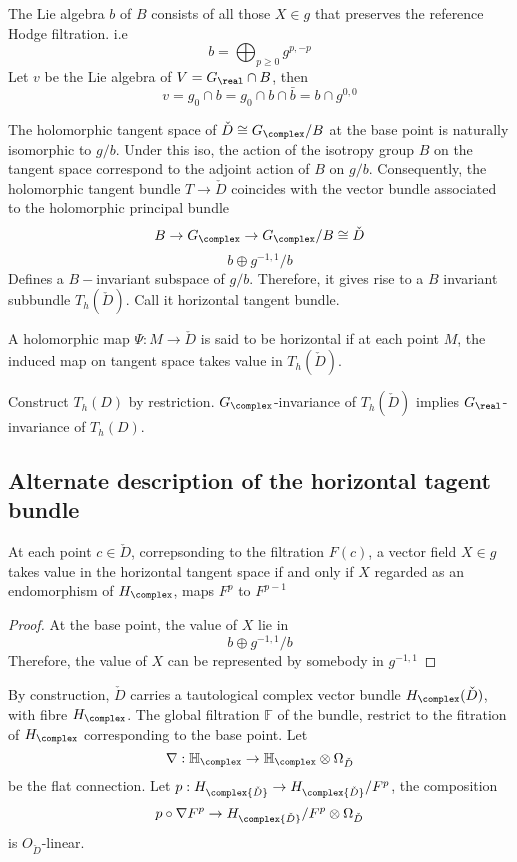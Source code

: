 \documentclass{article}
\begin{document}
The Lie algebra $b$ of $B$ consists of all those $X \in g$ that preserves the reference Hodge
filtration. i.e
\[
    b = \bigoplus_{p\ge 0} g^{p,-p}
\]
Let $v$ be the Lie algebra of $V = G_{\real}\cap B$, then
\[
    v = g_0 \cap b = g_0\cap b \cap \bar{b} = b\cap g^{0,0}
\]

The holomorphic tangent space of $\check{D} \cong G_{\complex}/B$ at 
the base point is naturally isomorphic to $g/b$. Under this iso, the
action of the isotropy group $B$ on the tangent space correspond to
the adjoint action of $B$ on $g/b$. Consequently, the holomorphic tangent
bundle $T \rightarrow \check{D}$ coincides with the vector bundle associated
to the holomorphic principal bundle
\[
    B \rightarrow G_{\complex} \rightarrow G_{\complex}/B \cong \check{D}
\]
\[
    b \oplus g^{-1,1}/b 
\]
Defines a $B-$invariant subspace of $g/b$. Therefore, it gives rise to a $B$
invariant subbundle $T_h(\check{D})$. Call it horizontal tangent bundle.

A holomorphic map $\Psi: M \rightarrow \check{D}$ is said to be horizontal if 
at each point $M$, the induced map on tangent space takes value in $T_h(\check{D})$.

Construct $T_h(D)$ by restriction. $G_{\complex}$-invariance of $T_h(\check{D})$ 
implies $G_{\real}$-invariance of $T_h(D)$. 

\subsection{Alternate description of the horizontal tagent bundle}
\begin{lemma}
At each point $c \in \check{D}$, correpsonding to the filtration $F(c)$, a vector
field $X \in g$ takes value in the horizontal tangent space if and only if
$X$ regarded as an endomorphism of $H_{\complex}$, maps $F^p$ to $F^{p-1}$
\end{lemma}
\begin{proof}
At the base point, the value of $X$ lie in
\[
    b\oplus g^{-1,1}/b
\]
Therefore, the value of $X$ can be represented by somebody in $g^{-1,1}$
\end{proof}

By construction, $\check{D}$ carries a tautological complex vector bundle $H_{\complex}(\check{D})$,
with fibre $H_{\complex}$. The global filtration $\mathbb{F}$ of the bundle, restrict to the 
fitration of $H_{\complex}$ corresponding to the base point. Let
\[
    \nabla: \mathbb{H_{\complex}} \rightarrow \mathbb{H_{\complex}}\otimes \Omega_{\check{D}}
\]
be the flat connection. 
\newcommand{\hd}{H_{\complex{\check{D}}}}
Let $p:\hd \rightarrow \hd/F^p$, the composition
\[
    p\circ\nabla F^p \rightarrow \hd/F^p \otimes \Omega_{\check{D}}
\]
is $O_{\check{D}}$-linear. 
\end{document}
